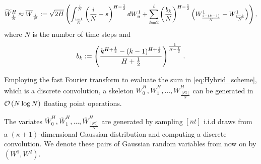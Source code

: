 \begin{equation*}\label{eq:Hybrid_scheme}
\widetilde{W}^H_{\frac{i}{N}} \approx \overline{W}_{\frac{i}{N}}:= \sqrt{2H} \left(\int_{\frac{i-1}{N}}^{\frac{i}{N}} \left(\frac{i}{N} -s\right)^{H-\frac{1}{2}} dW_u^1+\sum_{k=2}^{i} \left(\frac{b_k}{N}\right)^{H-\frac{1}{2}} \left(W_{\frac{i-(k-1)}{N}}^1-W_{\frac{i-k}{N}}^1\right)\right) ,
\end{equation*}
where $N$ is the number of time steps and 
$$ b_k:=\left(\frac{k^{H+\frac{1}{2}}-(k-1)^{H+\frac{1}{2} }}{H+\frac{1}{2}}\right)^{\frac{1}{H-\frac{1}{2}}} .$$

Employing the fast Fourier transform to evaluate the sum in \eqref{eq:Hybrid_scheme}, which is a discrete convolution, a skeleton $\bar{W}_0^{H},\bar{W}_1^{H},\dots,\bar{W}_{\frac{[Nt]}{N}}^{H}$ can be generated in ${\mathcal{O}}\left(N \log N\right)$ floating point operations.



The variates $\bar{W}_0^{H},\bar{W}_1^{H},\dots,\bar{W}_{\frac{[Nt]}{N}}^{H}$ are  generated by sampling $[nt]$ i.i.d draws from a $(\kappa+1)$-dimensional Gaussian distribution and computing a discrete convolution. We denote these pairs  of Gaussian random variables from now on by $(W^1,W^2)$.
